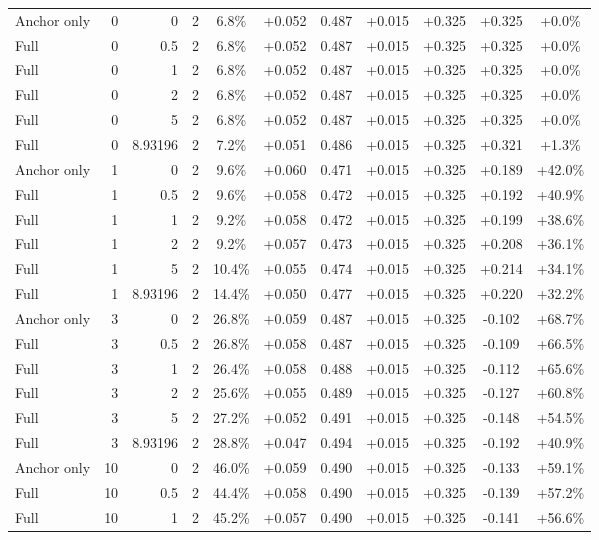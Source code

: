 \begin{table}[htbp]
\begin{tabular}{lrrrccccccc}
Anchor only & 0 & 0 & 2 & 6.8\% & +0.052 & 0.487 & +0.015 & +0.325 & +0.325 & +0.0\% \\
Full & 0 & 0.5 & 2 & 6.8\% & +0.052 & 0.487 & +0.015 & +0.325 & +0.325 & +0.0\% \\
Full & 0 & 1 & 2 & 6.8\% & +0.052 & 0.487 & +0.015 & +0.325 & +0.325 & +0.0\% \\
Full & 0 & 2 & 2 & 6.8\% & +0.052 & 0.487 & +0.015 & +0.325 & +0.325 & +0.0\% \\
Full & 0 & 5 & 2 & 6.8\% & +0.052 & 0.487 & +0.015 & +0.325 & +0.325 & +0.0\% \\
Full & 0 & 8.93196 & 2 & 7.2\% & +0.051 & 0.486 & +0.015 & +0.325 & +0.321 & +1.3\% \\
Anchor only & 1 & 0 & 2 & 9.6\% & +0.060 & 0.471 & +0.015 & +0.325 & +0.189 & +42.0\% \\
Full & 1 & 0.5 & 2 & 9.6\% & +0.058 & 0.472 & +0.015 & +0.325 & +0.192 & +40.9\% \\
Full & 1 & 1 & 2 & 9.2\% & +0.058 & 0.472 & +0.015 & +0.325 & +0.199 & +38.6\% \\
Full & 1 & 2 & 2 & 9.2\% & +0.057 & 0.473 & +0.015 & +0.325 & +0.208 & +36.1\% \\
Full & 1 & 5 & 2 & 10.4\% & +0.055 & 0.474 & +0.015 & +0.325 & +0.214 & +34.1\% \\
Full & 1 & 8.93196 & 2 & 14.4\% & +0.050 & 0.477 & +0.015 & +0.325 & +0.220 & +32.2\% \\
Anchor only & 3 & 0 & 2 & 26.8\% & +0.059 & 0.487 & +0.015 & +0.325 & -0.102 & +68.7\% \\
Full & 3 & 0.5 & 2 & 26.8\% & +0.058 & 0.487 & +0.015 & +0.325 & -0.109 & +66.5\% \\
Full & 3 & 1 & 2 & 26.4\% & +0.058 & 0.488 & +0.015 & +0.325 & -0.112 & +65.6\% \\
Full & 3 & 2 & 2 & 25.6\% & +0.055 & 0.489 & +0.015 & +0.325 & -0.127 & +60.8\% \\
Full & 3 & 5 & 2 & 27.2\% & +0.052 & 0.491 & +0.015 & +0.325 & -0.148 & +54.5\% \\
Full & 3 & 8.93196 & 2 & 28.8\% & +0.047 & 0.494 & +0.015 & +0.325 & -0.192 & +40.9\% \\
Anchor only & 10 & 0 & 2 & 46.0\% & +0.059 & 0.490 & +0.015 & +0.325 & -0.133 & +59.1\% \\
Full & 10 & 0.5 & 2 & 44.4\% & +0.058 & 0.490 & +0.015 & +0.325 & -0.139 & +57.2\% \\
Full & 10 & 1 & 2 & 45.2\% & +0.057 & 0.490 & +0.015 & +0.325 & -0.141 & +56.6\% \\

\end{tabular}
\end{table}
